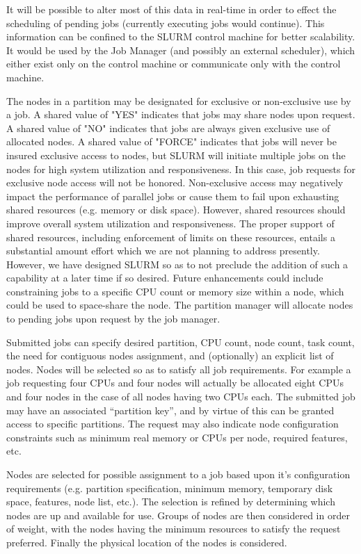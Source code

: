 It will be possible to alter most of this data in real-time in order
to effect the scheduling of pending jobs (currently executing jobs
would continue).  This information can be confined to the SLURM control
machine for better scalability.  It would be used by the Job Manager
(and possibly an external scheduler), which either exist only on the
control machine or communicate only with the control machine. 

The nodes in a partition may be designated for exclusive or non-exclusive
use by a job.  A shared value of "YES" indicates that jobs may share nodes
upon request.  A shared value of "NO" indicates that jobs are always given
exclusive use of allocated nodes.  A shared value of "FORCE" indicates
that jobs will never be insured exclusive access to nodes, but SLURM
will initiate multiple jobs on the nodes for high system utilization
and responsiveness.  In this case, job requests for exclusive node
access will not be honored.  Non-exclusive access may negatively impact
the performance of parallel jobs or cause them to fail upon exhausting
shared resources (e.g. memory or disk space). However, shared resources
should improve overall system utilization and responsiveness. The
proper support of shared resources, including enforcement of limits on
these resources, entails a substantial amount effort which we are not
planning to address presently.  However, we have designed SLURM so as
to not preclude the addition of such a capability at a later time if
so desired.  Future enhancements could include constraining jobs to a
specific CPU count or memory size within a node, which could be used
to space-share the node.  The partition manager will allocate nodes to
pending jobs upon request by the job manager.

Submitted jobs can specify desired partition, CPU count, node count,
task count,  the need for contiguous nodes assignment, and (optionally)
an explicit list of nodes.  Nodes will be selected so as to satisfy all
job requirements.  For example a job requesting four CPUs and four nodes
will actually be allocated eight CPUs and four nodes in the case of all
nodes having two CPUs each.  The submitted job may have an associated
``partition key'', and by virtue of this can be granted access to specific partitions.
The request may also indicate node configuration constraints such as
minimum real memory or CPUs per node, required features, etc.

Nodes are selected for possible assignment to a job based upon it's
configuration requirements (e.g. partition specification, minimum memory,
temporary disk space, features, node list, etc.).  The selection is
refined by determining which nodes are up and available for use.
Groups of nodes are then considered in order of weight, with the
nodes having the minimum resources to satisfy the request preferred.
Finally the physical location of the nodes is considered.

